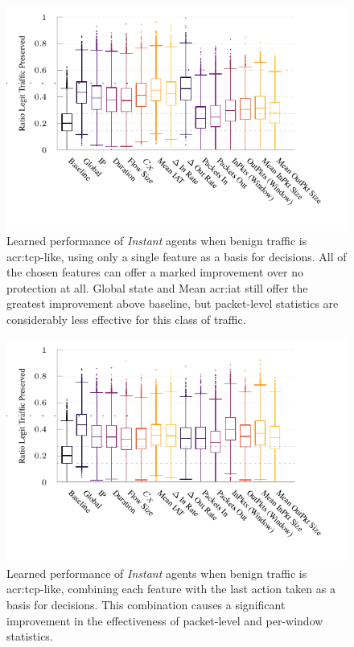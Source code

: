 \begin{figure}
	\centering
	\includegraphics[width=\linewidth]{plots/marl/ftprep-tcp-cap-box}
	\caption[Learned performance of \emph{Instant} agents when benign traffic is TCP-like, using only a single feature as a basis for decisions.]{
		Learned performance of \emph{Instant} agents when benign traffic is \gls{acr:tcp}-like, using only a single feature as a basis for decisions.
		All of the chosen features can offer a marked improvement over no protection at all.
		Global state and Mean \gls{acr:iat} still offer the greatest improvement above baseline, but packet-level statistics are considerably less effective for this class of traffic.
		\label{fig:tcp-cap-feature-plots}
	}
\end{figure}

\begin{figure}
	\centering
	\includegraphics[width=\linewidth]{plots/marl/ftprep-tcp-laf-cap-box}
	\caption[Learned performance of \emph{Instant} agents when benign traffic is TCP-like, jointly tiling each feature with the last action taken.]{
		Learned performance of \emph{Instant} agents when benign traffic is \gls{acr:tcp}-like, combining each feature with the last action taken as a basis for decisions.
		This combination causes a significant improvement in the effectiveness of packet-level and per-window statistics.
		\label{fig:tcp-laf-feature-plots}
	}
\end{figure}

